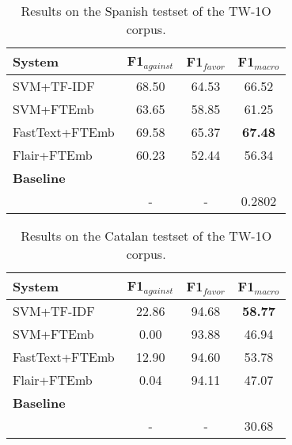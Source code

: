 \documentclass[10pt, a4paper]{article}
\begin{document}
\begin{table}[!ht]\small
\centering
\begin{tabular}{lccc} \hline
\textbf{System} & F1$_{against}$ & F1$_{favor}$ & F1$_{macro}$ \\ \hline
SVM+TF-IDF & 68.50 & 64.53 & 66.52 \\
SVM+FTEmb & 63.65 & 58.85 & 61.25 \\
FastText+FTEmb & 69.58 & 65.37 & \textbf{67.48} \\
Flair+FTEmb & 60.23 & 52.44 & 56.34 \\ \hline
\textbf{Baseline} \\
\cite{Segura-Bedmar18} & - & - & 0.2802 \\ \hline
\end{tabular}
\caption{Results on the Spanish testset of the TW-1O corpus.}\label{tab:result_tw1o_es}
\end{table}

\begin{table}[!ht]\small
\centering
\begin{tabular}{lccc} \hline
\textbf{System} & F1$_{against}$ & F1$_{favor}$ & F1$_{macro}$\\ \hline
SVM+TF-IDF & 22.86 & 94.68 & \textbf{58.77} \\
SVM+FTEmb & 0.00 & 93.88 & 46.94 \\
FastText+FTEmb & 12.90 & 94.60 & 53.78 \\
Flair+FTEmb & 0.04 & 94.11 & 47.07 \\ \hline
\textbf{Baseline} \\
\scriptsize{\cite{Cuquerella2018CriCaTM}} & - & - & 30.68 \\  \hline
\end{tabular}
\caption{Results on the Catalan testset of the TW-1O corpus.}\label{tab:result_tw1o_ca}
\end{table}


\end{document}
